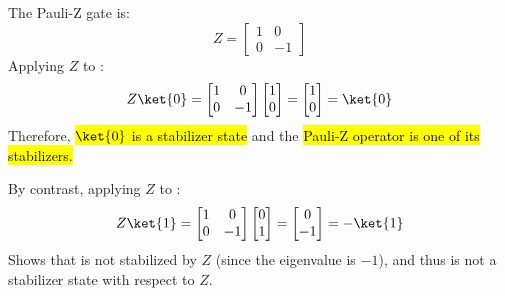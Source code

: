\highspace
\begin{examplebox}
    The Pauli-Z gate is:
    \begin{equation*}
        Z = \begin{bmatrix}
            1 & 0 \\
            0 & -1
        \end{bmatrix}
    \end{equation*}
    Applying $Z$ to :
    \begin{equation*}
        Z\ket{0} = \begin{bmatrix}
            1 & 0 \\
            0 & -1
        \end{bmatrix} \begin{bmatrix}
            1 \\
            0
        \end{bmatrix} = \begin{bmatrix}
            1 \\
            0
        \end{bmatrix} = \ket{0}
    \end{equation*}
    Therefore, \hl{$\ket{0}$ is a stabilizer state} and the \hl{Pauli-Z operator is one of its stabilizers.}

    \highspace
    By contrast, applying $Z$ to :
    \begin{equation*}
        Z\ket{1} = \begin{bmatrix}
            1 & 0 \\
            0 & -1
        \end{bmatrix} \begin{bmatrix}
            0 \\
            1
        \end{bmatrix} = \begin{bmatrix}
            0 \\
            -1
        \end{bmatrix} = -\ket{1}
    \end{equation*}
    Shows that  is not stabilized by $Z$ (since the eigenvalue is $-1$), and thus  is not a stabilizer state with respect to $Z$.
\end{examplebox}

